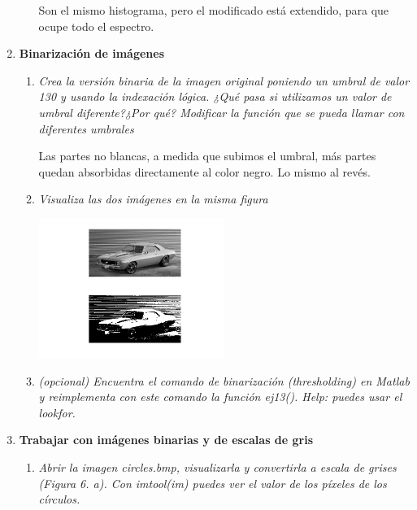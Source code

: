 \documentclass{article}
\begin{document}
\begin{enumerate}
\begin{enumerate}
 Son el mismo histograma, pero el modificado está extendido, para que ocupe todo el espectro.

 \end{enumerate}

\newpage

 \item \textbf{Binarización de imágenes}

 \begin{enumerate}
 \item \textit{Crea la versión binaria de la imagen original poniendo un umbral de
valor 130 y usando la indexación lógica. ¿Qué pasa si utilizamos un
valor de umbral diferente?¿Por qué? Modificar la función que se pueda
llamar con diferentes umbrales}

 Las partes no blancas, a medida que subimos el umbral, más partes quedan absorbidas directamente al color negro. Lo mismo al revés.

 \item \textit{Visualiza las dos imágenes en la misma figura}

 \begin{center}
 \includegraphics[width=0.5\textwidth]{subplot_3_binarize.png}
 \end{center}

 \item \textit{(opcional) Encuentra el comando de binarización (thresholding) en Matlab y
reimplementa con este comando la función ej13(). Help: puedes usar
el lookfor.}


 \end{enumerate}

\newpage

 \item \textbf{Trabajar con imágenes binarias y de escalas de gris}

 \begin{enumerate}
 \item \textit{Abrir la imagen circles.bmp, visualizarla y convertirla a escala de grises (Figura
6. a). Con imtool(im) puedes ver el valor de los píxeles de los círculos.}


\end{enumerate}
\end{enumerate}
\end{document}
